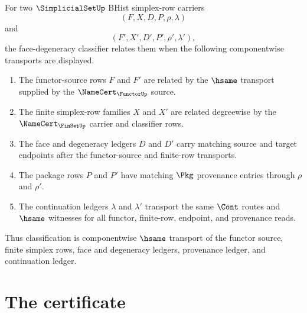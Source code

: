 \begin{definition}
\label{def:simplicialset-face-degeneracy-classifier}
For two $\SimplicialSetUp$ BHist simplex-row carriers
$$
(F,X,D,P,\rho,\lambda)
$$
and
$$
(F',X',D',P',\rho',\lambda'),
$$
the face-degeneracy classifier relates them when the following componentwise transports are displayed.
\begin{enumerate}
\item The functor-source rows $F$ and $F'$ are related by the $\hsame$ transport supplied by the $\NameCert_{\FunctorUp}$ source.
\item The finite simplex-row families $X$ and $X'$ are related degreewise by the $\NameCert_{\FinSetUp}$ carrier and classifier rows.
\item The face and degeneracy ledgers $D$ and $D'$ carry matching source and target endpoints after the functor-source and finite-row transports.
\item The package rows $P$ and $P'$ have matching $\Pkg$ provenance entries through $\rho$ and $\rho'$.
\item The continuation ledgers $\lambda$ and $\lambda'$ transport the same $\Cont$ routes and $\hsame$ witnesses for all functor, finite-row, endpoint, and provenance reads.
\end{enumerate}
Thus classification is componentwise $\hsame$ transport of the functor source, finite simplex rows, face and degeneracy ledgers, provenance ledger, and continuation ledger.
\end{definition}

\section{The certificate}
\label{sec:simplicialset-certificate}

